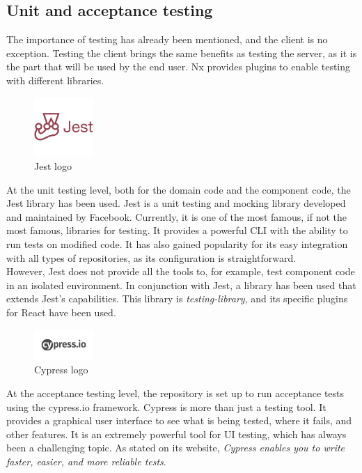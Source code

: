 \documentclass[../memory.tex]{subfiles}
\begin{document}
\subsection{Unit and acceptance testing}
The importance of testing has already been mentioned, and the client is no
exception. Testing the client brings the same benefits as testing the server, as
it is the part that will be used by the end user. Nx provides plugins to enable
testing with different libraries.
\begin{figure}[H]
	\centering
	\includegraphics[width=0.2\textwidth]{./assets/logos/jest-logo.png}
	\caption{Jest logo}
\end{figure}
At the unit testing level, both for the domain code and the component code, the
Jest library has been used. Jest is a unit testing and mocking library developed
and maintained by Facebook. Currently, it is one of the most famous, if not the
most famous, libraries for testing. It provides a powerful CLI with the ability
to run tests on modified code. It has also gained popularity for its easy
integration with all types of repositories, as its configuration is
straightforward.
\\
However, Jest does not provide all the tools to, for example, test component
code in an isolated environment. In conjunction with Jest, a library has been
used that extends Jest's capabilities. This library is \emph{testing-library},
and its specific plugins for React have been used.
\begin{figure}[H]
	\centering
	\includegraphics[width=0.2\textwidth]{./assets/logos/cypress-logo.png}
	\caption{Cypress logo}
\end{figure}
At the acceptance testing level, the repository is set up to run acceptance
tests using the cypress.io framework. Cypress is more than just a testing tool.
It provides a graphical user interface to see what is being tested, where it
fails, and other features. It is an extremely powerful tool for UI testing,
which has always been a challenging topic. As stated on its website,
\emph{Cypress enables you to write faster, easier, and more reliable
	tests}\cite{cypress}.
\end{document}
